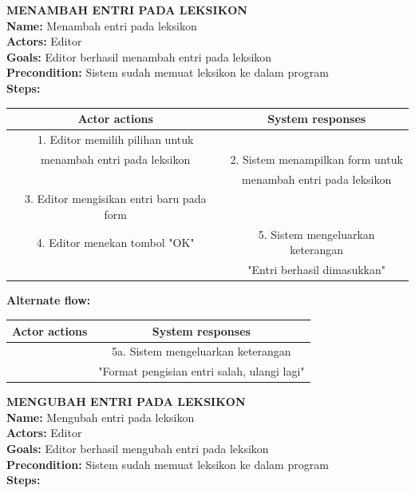 \textbf{MENAMBAH ENTRI PADA LEKSIKON}\\
\textbf{Name:} Menambah entri pada leksikon\\
\textbf{Actors:} Editor\\
\textbf{Goals:} Editor berhasil menambah entri pada leksikon\\
\textbf{Precondition:} Sistem sudah memuat leksikon ke dalam program\\
\textbf{Steps:}

\begin{table}[H]
\centering
\begin{tabular}{|c|c|}
\hline
\textbf{Actor actions} & \textbf{System responses} \\
\hline
1. Editor memilih pilihan untuk&\\ menambah entri pada leksikon&
2. Sistem menampilkan form untuk \\&menambah entri pada leksikon\\
3. Editor mengisikan entri baru pada form&\\
4. Editor menekan tombol "OK"&
5. Sistem mengeluarkan keterangan \\&"Entri berhasil dimasukkan"\\
\hline
\end{tabular}
\end{table}

\textbf{Alternate flow:}

\begin{table}[H]
\centering
\begin{tabular}{|c|c|}
\hline
\textbf{Actor actions} & \textbf{System responses} \\
\hline
&5a. Sistem mengeluarkan keterangan \\&"Format pengisian entri salah, ulangi lagi"\\
\hline
\end{tabular}
\end{table}

\textbf{MENGUBAH ENTRI PADA LEKSIKON}\\
\textbf{Name:} Mengubah entri pada leksikon\\
\textbf{Actors:} Editor\\
\textbf{Goals:} Editor berhasil mengubah entri pada leksikon\\
\textbf{Precondition:} Sistem sudah memuat leksikon ke dalam program\\
\textbf{Steps:}

